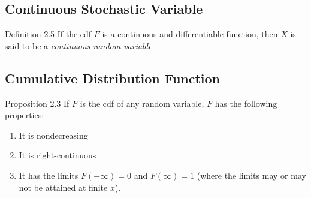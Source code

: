 \subsection{Continuous Stochastic Variable}
\begin{boks}{Definition 2.5}
If the cdf $F$ is a continuous and differentiable function, then $X$ is said to be a \textit{continuous random variable}.
\end{boks}

\subsection{Cumulative Distribution Function}
\begin{boks}{Proposition 2.3}
If $F$ is the cdf of any random variable, $F$ has the following properties:
\begin{enumerate}
    \item It is nondecreasing
    \item It is right-continuous
    \item It has the limits $F(-\infty) = 0$ and $F(\infty) = 1$ (where the limits may or may not be attained at finite $x$).
\end{enumerate}
\end{boks}


